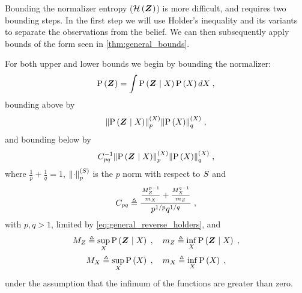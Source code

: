 \begin{proofE}
	Bounding the normalizer entropy ($\mathcal{H}\left({\boldsymbol Z_{}}\right)$) is more difficult, and requires two bounding steps. In the first step we will use Holder's inequality and its variants~\cite{Wang77cmb} to separate the observations from the belief. We can then subsequently apply bounds of the form seen in \cref{thm:general_bounds}.

	For both upper and lower bounds we begin by bounding the normalizer:
	\begin{equation*}
		\mathrm{P}\left({\boldsymbol Z_{}}\right)=\int\mathrm{P}\left({\boldsymbol Z_{}}\mid{\ensuremath{X_{}}}\right)\mathrm{P}\left({X_{}}\right)dX_{}\;,
	\end{equation*}
	bounding above by
	\begin{equation}
		\pnorm{\probcond{\observationsRV{}}{\states{}}}{p}{\states{}}\pnorm{\prob{\states{}}}{q}{\states{}}\;,\label{eq:general_holders}
	\end{equation}
	and bounding below by~\cite{Wang77cmb}
	\begin{equation}
		C_{pq}^{-1}\pnorm{\probcond{\observationsRV{}}{\states{}}}{p}{\states{}}\pnorm{\prob{\states{}}}{q}{\states{}}\;,\label{eq:general_reverse_holders}
	\end{equation}
	where $\frac{1}{p}+\frac{1}{q}=1$, $\left\lVert\cdot\right\rVert_{p}^{(S)}$ is the $p$ norm with respect to $S$ and
	\begin{equation*}
		C_{pq}\triangleq\frac{\frac{M_{Z_{}}^{p-1}}{m_{X_{}}}+ \frac{M_{X_{}}^{q-1}}{m_{Z_{}}}}{p^{1/p}q^{1/q}}\;,
	\end{equation*}
	with $p,q>1$, limited by \eqref{eq:general_reverse_holders}, and
	\begin{gather*}
		M_{Z_{}}\triangleq\sup_{X_{}}\mathrm{P}\left({\boldsymbol Z_{}}\mid{\ensuremath{X_{}}}\right)\;,\quad
		m_{Z_{}}\triangleq\inf_{X_{}}\mathrm{P}\left({\boldsymbol Z_{}}\mid{\ensuremath{X_{}}}\right)\;,
		\\
		M_{X_{}}\triangleq\sup_{X_{}}\mathrm{P}\left({X_{}}\right)\;,\quad
		m_{X_{}}\triangleq\inf_{X_{}}\mathrm{P}\left({X_{}}\right)\;,
	\end{gather*}
	under the assumption that the infimum of the functions are greater than zero.


\end{proofE}
